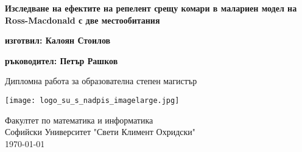 \begin{titlepage}
  \begin{center}
    \vspace*{1cm}

    \Huge
    \textbf{Изследване на ефектите на репелент срещу комари в малариен модел на Ross-Macdonald с две местообитания}


    \vspace{1.5cm}

    \textbf{изготвил: Калоян Стоилов}

    \vspace{0.8cm}

    \textbf{ръководител: Петър Рашков}

    \vfill

    Дипломна работа за образователна степен магистър

    \vspace{0.8cm}

    \texttt{[image: logo\_su\_s\_nadpis\_imagelarge.jpg]}

    \Large
    Факултет по математика и информатика\\
    Софийски Университет "Свети Климент Охридски"\\
    \today

  \end{center}
\end{titlepage}
